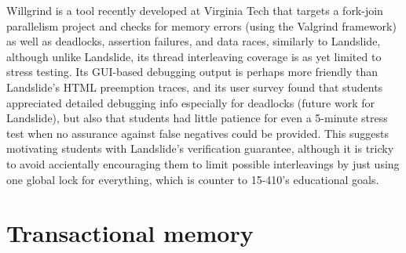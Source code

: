 Willgrind \cite{willgrind} is a tool recently developed at Virginia Tech
that targets a fork-join parallelism project
and checks for memory errors (using the Valgrind \cite{valgrind} framework)
as well as deadlocks, assertion failures, and data races, similarly to Landslide,
although unlike Landslide, its thread interleaving coverage is as yet limited to stress testing.
Its GUI-based debugging output is perhaps more friendly than Landslide's HTML preemption traces,
and its user survey found that students appreciated detailed debugging info especially for deadlocks
(future work for Landslide),
but also that students had little patience for even a 5-minute stress test
when no assurance against false negatives could be provided.
This suggests motivating students with Landslide's verification guarantee,
although it is tricky to avoid accientally encouraging %
them to limit possible interleavings by just using one global lock for everything,
which is counter to 15-410's educational goals.



\section{Transactional memory}


